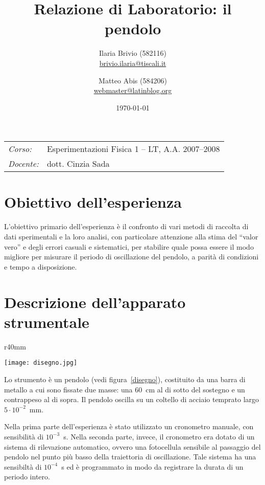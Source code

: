 \documentclass[italian,a4paper,10pt]{article}
\theoremstyle{definition}
\begin{document}
\title{Relazione di Laboratorio: il pendolo}
\author{\normalsize Ilaria Brivio (582116)\\%
\normalsize \url{brivio.ilaria@tiscali.it}%
\and %
\normalsize Matteo Abis (584206)\\ %
\normalsize \url{webmaster@latinblog.org}}
\date{\today}
\maketitle
\begin{table}[hpt]
 \begin{tabular}{l l}
  \emph{Corso:} &Esperimentazioni Fisica 1 -- LT, A.A. 2007--2008\\
  \emph{Docente:} &dott. Cinzia Sada\\
 \end{tabular}
\end{table}
\section{Obiettivo dell'esperienza}
L'obiettivo primario dell'esperienza è il confronto di vari metodi di raccolta di dati sperimentali e la loro analisi, con particolare attenzione alla stima del ``valor vero'' e degli errori casuali e sistematici, per stabilire quale possa essere il modo migliore per misurare il periodo di oscillazione del pendolo, a parità di condizioni e tempo a disposizione.
\section{Descrizione dell'apparato strumentale}
\renewcommand{\arraystretch}{1.2}
\begin{wrapfigure}[16]{r}{40mm}
  \begin{center}
    \texttt{[image: disegno.jpg]}
  \end{center}
  \caption{Rappresentazione schematica del pendolo.}\label{disegno}
\end{wrapfigure}
Lo strumento è un pendolo (vedi figura~\ref{disegno}), costituito da una barra di metallo a cui sono fissate due masse: una $60$~cm al di sotto del sostegno e un contrappeso al di sopra. Il pendolo oscilla su un coltello di acciaio temprato largo $5\cdot10^{-2}$~mm.

Nella prima parte dell'esperienza è stato utilizzato un cronometro manuale, con sensibilità di $10^{-3}$~s. Nella seconda parte, invece, il cronometro era dotato di un sistema di rilevazione automatico, ovvero una fotocellula sensibile al passaggio del pendolo nel punto più basso della traiettoria di oscillazione. Tale sistema ha una sensibiltà di $10^{-4}$~s ed è programmato in modo da registrare la durata di un periodo intero.
\end{document}
